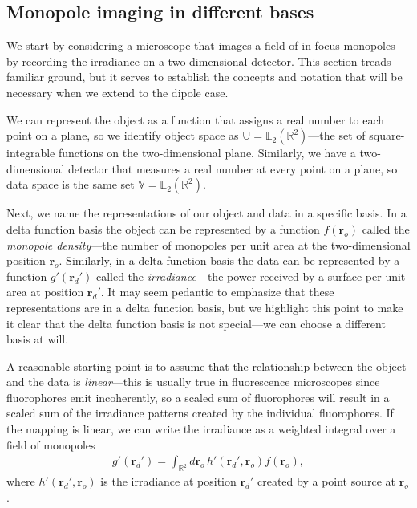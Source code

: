 \documentclass[]{osa-article}
\providecommand{\ro}{\mathbf{\mathbf{r}}_o}
\providecommand{\rd}{\mathbf{r}_d}
\providecommand{\mbb}[1]{\mathbb{#1}}
\begin{document}
\subsection{Monopole imaging in different bases}\label{sec:monopole}
We start by considering a microscope that images a field of in-focus monopoles
by recording the irradiance on a two-dimensional detector. This section treads
familiar ground, but it serves to establish the concepts and notation that will
be necessary when we extend to the dipole case.

We can represent the object as a function that assigns a real number to each
point on a plane, so we identify object space as
$\mbb{U} = \mbb{L}_2(\mbb{R}^2)$---the set of square-integrable functions on the
two-dimensional plane. Similarly, we have a two-dimensional detector that
measures a real number at every point on a plane, so data space is the same set
$\mbb{V} = \mbb{L}_2(\mbb{R}^2)$.

Next, we name the representations of our object and data in a specific basis. In
a delta function basis the object can be represented by a function $f(\ro)$
called the \textit{monopole density}---the number of monopoles per unit area at
the two-dimensional position $\ro$. Similarly, in a delta function basis the
data can be represented by a function $g'(\rd')$ called the
\textit{irradiance}---the power received by a surface per unit area at position
$\rd'$. It may seem pedantic to emphasize that these representations are in a
delta function basis, but we highlight this point to make it clear that the
delta function basis is not special---we can choose a different basis at will.

A reasonable starting point is to assume that the relationship between the
object and the data is \textit{linear}---this is usually true in fluorescence
microscopes since fluorophores emit incoherently, so a scaled sum of
fluorophores will result in a scaled sum of the irradiance patterns created by
the individual fluorophores. If the mapping is linear, we can write the
irradiance as a weighted integral over a field of monopoles
\begin{align}
g'(\rd') = \int_{\mbb{R}^2}d\ro\, h'(\rd',\ro)f(\ro), \label{eq:fwdmono}
\end{align}
where $h'(\rd{}', \ro{})$ is the irradiance at position $\rd'$ created by a
point source at $\ro$.
\end{document}
